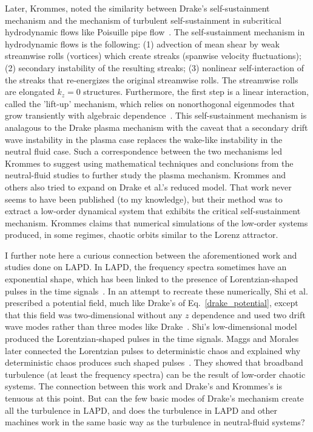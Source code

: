 Later, Krommes, noted the similarity between Drake's self-sustainment mechanism and the mechanism of turbulent self-sustainment in subcritical hydrodynamic flows like Poisuille pipe 
flow~\cite{krommes1999}. The self-sustainment mechanism in hydrodynamic flows is the following: (1) advection of mean shear by weak streamwise rolls (vortices) which create streaks (spanwise
velocity fluctuations); (2) secondary instability of the resulting streaks; (3) nonlinear self-interaction of the streaks that re-energizes the original streamwise rolls. The streamwise rolls
are elongated $k_z = 0$ structures. Furthermore, the first step is a linear interaction, called the 'lift-up' mechanism, which relies on nonorthogonal eigenmodes that grow transiently with
algebraic dependence~\cite{trefethen1993,waleffe1995,henningson1996}. This self-sustainment mechanism is analagous to the Drake plasma mechanism with the caveat that a secondary drift wave
instability in the plasma case replaces the wake-like instability in the neutral fluid case. Such a correspondence between the two mechanisms led Krommes to suggest using mathematical techniques
and conclusions from the neutral-fluid studies to further study the plasma mechanism. Krommes and others also tried to expand on Drake et al.'s reduced model. That work never seems to have been
published (to my knowledge), but their method was to extract a low-order dynamical system that exhibits the critical self-sustainment mechanism. Krommes claims that numerical simulations of the
low-order systems produced, in some regimes, chaotic orbits similar to the Lorenz attractor.

I further note here a curious connection between the aforementioned work and studies done on LAPD. In LAPD, the frequency spectra sometimes have an exponential shape, which has been linked
to the presence of Lorentzian-shaped pulses in the time signals~\cite{pace2008a,pace2008b}. In an attempt to recreate these numerically, Shi et al. prescribed a potential field, much like Drake's
of Eq.~\ref{drake_potential}, except that this field was two-dimensional without any $z$ dependence and used two drift wave modes rather than three modes like Drake~\cite{shi2009}. 
Shi's low-dimensional model produced the Lorentzian-shaped pulses in the time signals. 
Maggs and Morales later connected the Lorentzian pulses to deterministic chaos and explained why deterministic chaos produces such shaped pulses~\cite{maggs2011,maggs2012a,maggs2012b}.
They showed that broadband turbulence (at least the frequency spectra) can be the result of low-order chaotic systems. The connection between this work and Drake's and Krommes's is tenuous
at this point. But can the few basic modes of Drake's mechanism create all the turbulence in LAPD, and does the turbulence in LAPD and other machines work in the same basic way as the turbulence
in neutral-fluid systems?
